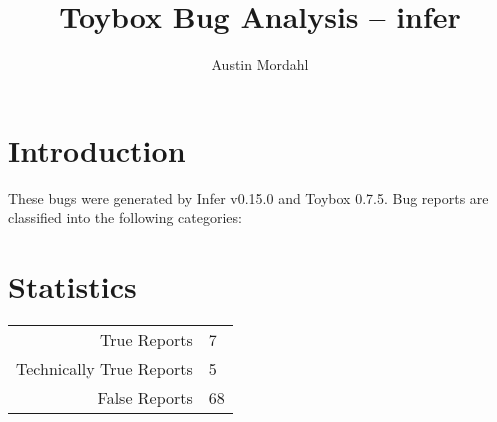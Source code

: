 

\title{Toybox Bug Analysis -- infer}
\author{Austin Mordahl}

\maketitle

\section{Introduction}
\noindent These bugs were generated by Infer v0.15.0 and Toybox 0.7.5. Bug reports are classified into the following categories:



\pagebreak

\section{Statistics}

\begin{center}
  \noindent\begin{tabular}{rl}\toprule
             True Reports & 7 \\
             Technically True Reports & 5 \\
             False Reports & 68 \\ \bottomrule
           \end{tabular}
\end{center}

